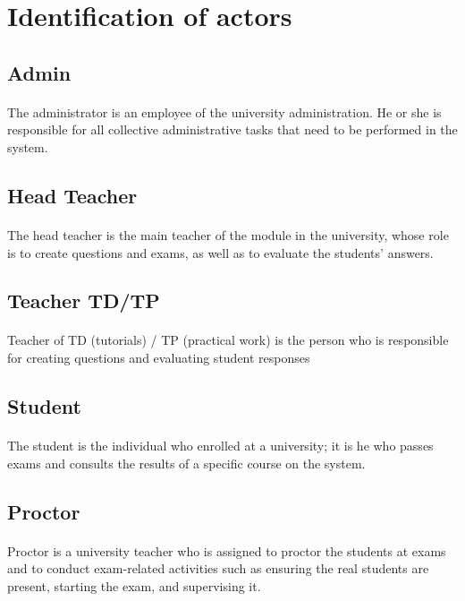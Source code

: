 \documentclass[]{uc2pfecaneva}
\begin{document}
    \raggedright\section{Identification of actors}
    \raggedright\subsection{Admin}
    \justifying\paragraph{}
    The administrator is an employee of the university administration. He or she is responsible for all collective administrative tasks that need to be performed in the system.

    \raggedright\subsection{Head Teacher}
    \justifying\paragraph{}
    The head teacher is the main teacher of the module in the university, whose role is to create questions and exams, as well as to evaluate the students' answers.

    \raggedright\subsection{Teacher TD/TP}
    \justifying\paragraph{}
    Teacher of TD (tutorials) / TP (practical work) is the person who is responsible for creating questions and evaluating student responses


    \raggedright\subsection{Student}
    \justifying\paragraph{}
    The student is the individual who enrolled at a university; it is he who passes exams and consults the results of a specific course on the system.

    \raggedright\subsection{Proctor}
    \justifying\paragraph{}
    Proctor is a university teacher who is assigned to proctor the students at exams and to conduct exam-related activities such as ensuring the real students are present, starting the exam, and supervising it.
\end{document}
